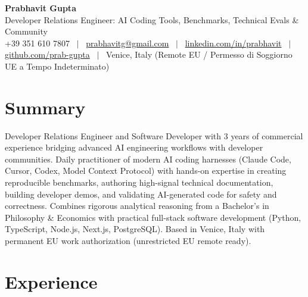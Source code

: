 \documentclass[a4paper,10pt]{article}
\begin{document}
\begin{minipage}[c]{0.80\textwidth}
  {\Huge\bfseries Prabhavit Gupta}\\[3pt]
  {\color{accent}\large Developer Relations Engineer: AI Coding Tools, Benchmarks, Technical Evals \& Community}\\[6pt]
  {\footnotesize +39 351 610 7807 ~$\vert$~
  \href{mailto:prabhavitg@gmail.com}{prabhavitg@gmail.com} ~$\vert$~
  \href{https://www.linkedin.com/in/prabhavit/}{linkedin.com/in/prabhavit} ~$\vert$~
  \href{https://github.com/prab-gupta}{github.com/prab-gupta} ~$\vert$~
  Venice, Italy (Remote EU / Permesso di Soggiorno UE a Tempo Indeterminato)}
\end{minipage}\hfill

\section{Summary}
Developer Relations Engineer and Software Developer with 3 years of commercial experience bridging advanced AI engineering workflows with developer communities. Daily practitioner of modern AI coding harnesses (Claude Code, Cursor, Codex, Model Context Protocol) with hands-on expertise in creating reproducible benchmarks, authoring high-signal technical documentation, building developer demos, and validating AI-generated code for safety and correctness. Combines rigorous analytical reasoning from a Bachelor's in Philosophy \& Economics with practical full-stack software development (Python, TypeScript, Node.js, Next.js, PostgreSQL). Based in Venice, Italy with permanent EU work authorization (unrestricted EU remote ready).

\section{Experience}
\end{document}
